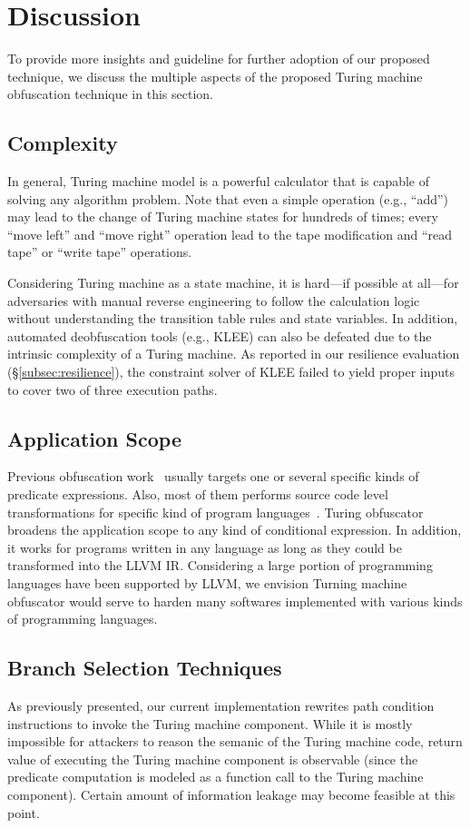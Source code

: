 \chapter{Discussion}
\label{sec:discussion}
To provide more insights and guideline for further adoption of our proposed
technique, we discuss the multiple aspects of the proposed Turing machine obfuscation
technique in this section.

\section{Complexity}
In general, Turing machine model is a powerful calculator that is capable of
solving any algorithm problem. Note that even a simple operation (e.g., ``add'')
may lead to the change of Turing machine states for hundreds of times; every
``move left'' and ``move right'' operation lead to the tape modification and
``read tape'' or ``write tape'' operations.

Considering Turing machine as a state machine, it is hard---if possible at
all---for adversaries with manual reverse engineering to follow the calculation
logic without understanding the transition table rules and state variables. In
addition, automated deobfuscation tools (e.g., KLEE) can also be defeated due to
the intrinsic complexity of a Turing machine. As reported in our resilience
evaluation (\S\ref{subsec:resilience}), the constraint solver of KLEE failed to
yield proper inputs to cover two of three execution paths.

\section{Application Scope}
Previous obfuscation work~\cite{Sharif} usually targets one or several specific
kinds of predicate expressions. Also, most of them performs source code level
transformations for specific kind of program languages~\cite{Trans}. Turing
obfuscator broadens the application scope to any kind of conditional expression.
In addition, it works for programs written in any language as long as they could
be transformed into the LLVM IR. Considering a large portion of programming
languages have been supported by LLVM, we envision Turning machine obfuscator
would serve to harden many softwares implemented with various kinds of
programming languages.

\section{Branch Selection Techniques}
As previously presented, our current implementation rewrites path condition
instructions to invoke the Turing machine component. While it is mostly
impossible for attackers to reason the semanic of the Turing machine code,
return value of executing the Turing machine component is observable (since the
predicate computation is modeled as a function call to the Turing machine
component). Certain amount of information leakage may become feasible at this
point.

